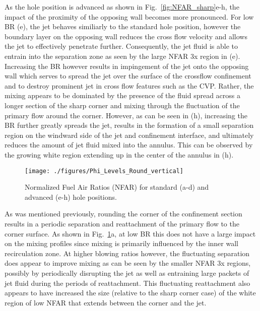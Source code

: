 \documentclass[10pt, twocolumn]{article}
\begin{document}
As the hole position is advanced as shown in Fig.~\ref{fig:NFAR_sharp}e-h, the impact of the proximity of the opposing wall becomes more pronounced. For low BR (e), the jet behaves similiarly to the standard hole position, however the boundary layer on the opposing wall reduces the cross flow velocity and allows the jet to effectively penetrate further. Consequently, the jet fluid is able to entrain into the separation zone as seen by the large NFAR 3x region in (e). Increasing the BR however results in impingement of the jet onto the opposing wall which serves to spread the jet over the surface of the crossflow confinement and to destroy prominent jet in cross flow features such as the CVP. Rather, the mixing appears to be dominated by the presence of the fluid spread across a longer section of the sharp corner and mixing through the fluctuation of the primary flow around the corner. However, as can be seen in (h), increasing the BR further greatly spreads the jet, results in the formation of a small separation region on the windward side of the jet and confinement interface, and ultimately reduces the amount of jet fluid mixed into the annulus. This can be observed by the growing white region extending up in the center of the annulus in (h).

\begin{figure}[t!]
	\centering
	\texttt{[image: ./figures/Phi\_Levels\_Round\_vertical]}
	\caption{Normalized Fuel Air Ratios (NFAR) for standard (a-d) and advanced (e-h) hole positions.}
	\label{fig:NFAR_round}
\end{figure}

As was mentioned previously, rounding the corner of the confinement section results in a periodic separation and reattachment of the primary flow to the corner surface. As shown in Fig.~\ref{fig:NFAR_round}a, at low BR this does not have a large impact on the mixing profiles since mixing is primarily influenced by the inner wall recirculation zone. At higher blowing ratios however, the fluctuating separation does appear to improve mixing as can be seen by the smaller NFAR 3x regions, possibly by periodically disrupting the jet as well as entraining large packets of jet fluid during the periods of reattachment. This fluctuating reattachment also appears to have increased the size (relative to the sharp corner case) of the white region of low NFAR that extends between the corner and the jet.
\end{document}
